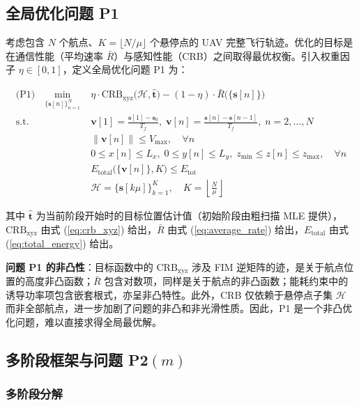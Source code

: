 \subsection{全局优化问题 P1}

考虑包含 $N$ 个航点、$K=\lfloor N/\mu\rfloor$ 个悬停点的 UAV 完整飞行轨迹。优化的目标是在通信性能（平均速率 $\bar{R}$）与感知性能（CRB）之间取得最优权衡。引入权重因子 $\eta\in[0,1]$，定义全局优化问题 P1 为：

\begin{align}
\text{(P1)}\quad\min_{\{\mathbf{s}[n]\}_{n=1}^{N}}\;& \eta\cdot\mathrm{CRB}_{\mathrm{xyz}}\bigl(\mathcal{H},\hat{\mathbf{t}}\bigr)-(1-\eta)\cdot\bar{R}\bigl(\{\mathbf{s}[n]\}\bigr)\\
\text{s.t.}\;&\mathbf{v}[1]=\frac{\mathbf{s}[1]-\mathbf{s}_0}{T_f},\;\mathbf{v}[n]=\frac{\mathbf{s}[n]-\mathbf{s}[n-1]}{T_f},\; n=2,\ldots,N\\
&\|\mathbf{v}[n]\|\leq V_{\max},\quad\forall n\\
&0\leq x[n]\leq L_x,\;0\leq y[n]\leq L_y,\;z_{\min}\leq z[n]\leq z_{\max},\quad\forall n\\
&E_{\mathrm{total}}\bigl(\{\mathbf{v}[n]\},K\bigr)\leq E_{\mathrm{tot}}\\
&\mathcal{H}=\bigl\{\mathbf{s}[k\mu]\bigr\}_{k=1}^{K},\quad K=\left\lfloor\frac{N}{\mu}\right\rfloor
\label{eq:p1}
\end{align}

其中 $\hat{\mathbf{t}}$ 为当前阶段开始时的目标位置估计值（初始阶段由粗扫描 MLE 提供\cite{Kay1993}），$\mathrm{CRB}_{\mathrm{xyz}}$ 由式 (\ref{eq:crb_xyz}) 给出，$\bar{R}$ 由式 (\ref{eq:average_rate}) 给出，$E_{\mathrm{total}}$ 由式 (\ref{eq:total_energy}) 给出。

\textbf{问题 P1 的非凸性}：目标函数中的 $\mathrm{CRB}_{\mathrm{xyz}}$ 涉及 FIM 逆矩阵的迹，是关于航点位置的高度非凸函数；$\bar{R}$ 包含对数项，同样是关于航点的非凸函数；能耗约束中的诱导功率项包含嵌套根式，亦呈非凸特性。此外，CRB 仅依赖于悬停点子集 $\mathcal{H}$ 而非全部航点，进一步加剧了问题的非凸和非光滑性质。因此，P1 是一个非凸优化问题，难以直接求得全局最优解。

\subsection{多阶段框架与问题 P2$(m)$}

\subsubsection{多阶段分解}

